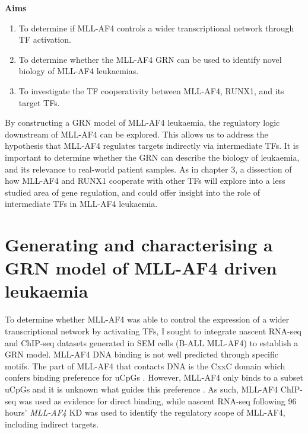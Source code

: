 \noindent
\textbf{Aims} 

\vspace*{-5mm}
\begin{enumerate}
    \item To determine if MLL-AF4 controls a wider transcriptional network through TF activation. 
    \item To determine whether the MLL-AF4 GRN can be used to identify novel biology of MLL-AF4 leukaemias.
    \item To investigate the TF cooperativity between MLL-AF4, RUNX1, and its target TFs.
\end{enumerate}

\vspace*{-5mm}
By constructing a GRN model of MLL-AF4 leukaemia, the regulatory logic downstream of MLL-AF4 can be explored. This allows us to address the hypothesis that MLL-AF4 regulates targets indirectly via intermediate TFs. It is important to determine whether the GRN can describe the biology of leukaemia, and its relevance to real-world patient samples. As in chapter 3, a dissection of how MLL-AF4 and RUNX1 cooperate with other TFs will explore into a less studied area of gene regulation, and could offer insight into the role of intermediate TFs in MLL-AF4 leukaemia.

\clearpage


\section{\label{ch4:grn}Generating and characterising a GRN model of MLL-AF4 driven leukaemia}

To determine whether MLL-AF4 was able to control the expression of a wider transcriptional network by activating TFs, I sought to integrate nascent RNA-seq and ChIP-seq datasets generated in SEM cells (B-ALL MLL-AF4) to establish a GRN model. MLL-AF4 DNA binding is not well predicted through specific motifs. The part of MLL-AF4 that contacts DNA is the CxxC domain which confers binding preference for uCpGs \citep{birke_mt_2002}. However, MLL-AF4 only binds to a subset uCpGs and it is unknown what guides this preference \citep{kerry_mll-af4_2017}. As such, MLL-AF4 ChIP-seq \citep{kerry_mll-af4_2017} was used as evidence for direct binding, while nascent RNA-seq following 96 hours' \textit{MLL-AF4} KD \citep{kerry_mll-af4_2017} was used to identify the regulatory scope of MLL-AF4, including indirect targets. 

